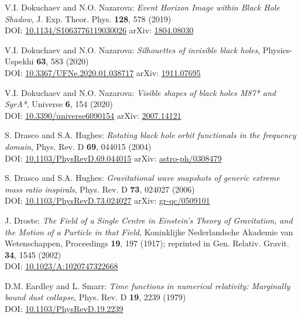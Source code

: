 \begin{thebibliography}{123}
V.I. Dokuchaev and N.O. Nazarova: {\em Event Horizon Image within Black Hole Shadow},
J. Exp. Theor. Phys. {\bf 128}, 578 (2019)\\
DOI: \href{https://doi.org/10.1134/S1063776119030026}{10.1134/S1063776119030026}\hfill
arXiv: \href{https://arxiv.org/abs/1804.08030}{1804.08030}

V.I. Dokuchaev and N.O. Nazarova: {\em Silhouettes of invisible black holes},
Physics-Uspekhi {\bf 63}, 583 (2020)\\
DOI: \href{https://doi.org/10.3367/UFNe.2020.01.038717}{10.3367/UFNe.2020.01.038717}\hfill
arXiv: \href{https://arxiv.org/abs/1911.07695}{1911.07695}

V.I. Dokuchaev and N.O. Nazarova: {\em Visible shapes of black holes M87* and SgrA*},
Universe {\bf 6}, 154 (2020)\\
DOI: \href{https://doi.org/10.3390/universe6090154}{10.3390/universe6090154}\hfill
arXiv: \href{https://arxiv.org/abs/2007.14121}{2007.14121}

S. Drasco and S.A. Hughes:
{\em Rotating black hole orbit functionals in the frequency domain},
Phys. Rev. D {\bf 69}, 044015 (2004)\\
DOI: \href{https://doi.org/10.1103/PhysRevD.69.044015}{10.1103/PhysRevD.69.044015}\hfill
arXiv: \href{https://arxiv.org/abs/astro-ph/0308479}{astro-ph/0308479}

S. Drasco and S.A. Hughes:
{\em Gravitational wave snapshots of generic extreme mass ratio inspirals},
Phys. Rev. D {\bf 73}, 024027 (2006)\\
DOI: \href{https://doi.org/10.1103/PhysRevD.73.024027}{10.1103/PhysRevD.73.024027}\hfill
arXiv: \href{https://arxiv.org/abs/gr-qc/0509101}{gr-qc/0509101}

J. Droste:
{\em The Field of a Single Centre in Einstein's Theory of Gravitation, and the Motion of a Particle in that Field},
Koninklijke Nederlandsche Akademie van Wetenschappen, Proceedings {\bf 19}, 197 (1917);
reprinted in Gen. Relativ. Gravit. {\bf 34}, 1545 (2002)\\
DOI: \href{https://doi.org/10.1023/A:1020747322668}{10.1023/A:1020747322668}

D.M. Eardley and L. Smarr:
{\em Time functions in numerical relativity: Marginally bound dust collapse},
Phys. Rev. D {\bf 19}, 2239 (1979) \\
DOI: \href{https://doi.org/10.1103/PhysRevD.19.2239}{10.1103/PhysRevD.19.2239}


\end{thebibliography}
